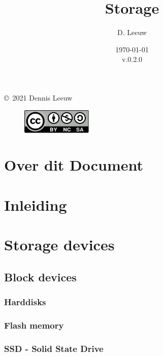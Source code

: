 \documentclass[a4paper,12pt,twoside,openright,titlepage]{book}
\author{D. Leeuw}
\title{Storage}
\date{\today\\v.0.2.0}
\begin{document}

\maketitle

\copyright\ 2021 Dennis Leeuw\\

\begin{figure}
\includegraphics[width=0.3\textwidth]{CC-BY-SA-NC.png}
\end{figure}

\bigskip




\frontmatter
\chapter{Over dit Document}



\tableofcontents

\mainmatter
\chapter{Inleiding}


\chapter{Storage devices}
\section{Block devices}

\subsection{Harddisks}

\subsection{Flash memory}

\subsection{SSD - Solid State Drive}
\end{document}
